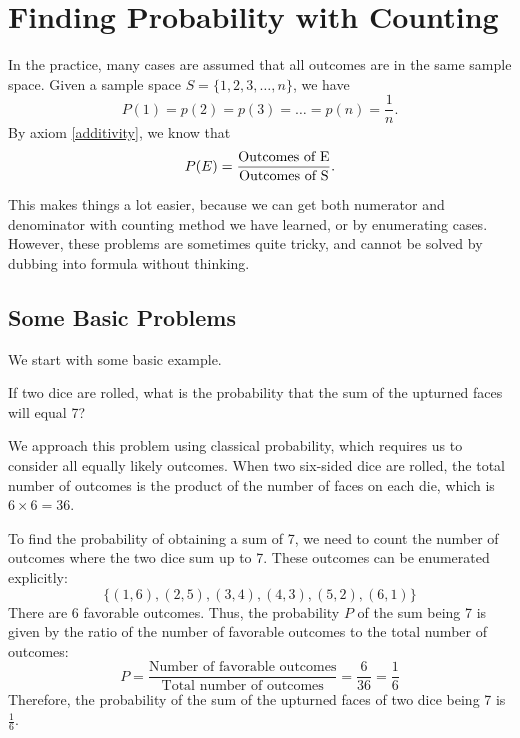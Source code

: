     \section{Finding Probability with Counting}
    In the practice, many cases are assumed that all outcomes are in the same sample space.
    Given a sample space $S = \{1,2,3,\dots,n\}$, we have 
    \begin{equation}
        P(1) = p(2) = p(3)=\dots = p(n) = \frac{1}{n}.
    \end{equation}
    By axiom \ref{additivity}, we know that
    \begin{equation}
        P(E) = \frac{\text{Outcomes of E}}{\text{Outcomes of S}}.
    \end{equation} 

    This makes things a lot easier, because we can get both numerator and denominator with counting 
    method we have learned, or by enumerating cases. However, these problems are sometimes quite tricky, and cannot be solved
    by dubbing into formula without thinking.

    \subsection{Some Basic Problems}
    We start with some basic example.

    \begin{example}
        If two dice are rolled, what is the probability that the sum of the upturned faces will equal 7?
        \end{example}
        
        \begin{solution}
        We approach this problem using classical probability, which requires us to consider all equally likely outcomes. When two six-sided dice are rolled, the total number of outcomes is the product of the number of faces on each die, which is $6 \times 6 = 36$.
        
        To find the probability of obtaining a sum of 7, we need to count the number of outcomes where the two dice sum up to 7. These outcomes can be enumerated explicitly:
        \[
        \{(1,6), (2,5), (3,4), (4,3), (5,2), (6,1)\}
        \]       
        There are 6 favorable outcomes. Thus, the probability $P$ of the sum being 7 is given by the ratio of the number of favorable outcomes to the total number of outcomes:
        \[
        P = \frac{\text{Number of favorable outcomes}}{\text{Total number of outcomes}} = \frac{6}{36} = \frac{1}{6}
        \]
        Therefore, the probability of the sum of the upturned faces of two dice being 7 is $\frac{1}{6}$.
        \end{solution}


